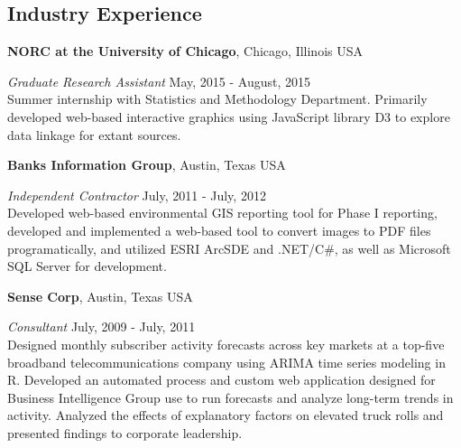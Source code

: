 \documentclass[margin,line]{res}
\begin{document}
\begin{resume}
% 
% 
% 

\section{\sc Industry Experience}
{\bf NORC at the University of Chicago}, Chicago, Illinois USA

\vspace{-.3cm}
{\em Graduate Research Assistant} \hfill {May, 2015 - August, 2015}\\
Summer internship with Statistics and Methodology Department. Primarily developed web-based interactive graphics using JavaScript library D3 to explore data linkage for extant sources. 

{\bf Banks Information Group}, Austin, Texas USA

\vspace{-.3cm}
{\em Independent Contractor} \hfill {July, 2011 - July, 2012}\\
Developed web-based environmental GIS reporting tool for Phase I reporting, developed and implemented a web-based tool to convert images to PDF files programatically, and utilized ESRI ArcSDE and .NET/C\#, as well as Microsoft SQL Server for development.

{\bf Sense Corp}, Austin, Texas USA

\vspace{-.3cm}
{\em Consultant} \hfill {July, 2009 - July, 2011}\\
Designed monthly subscriber activity forecasts across key markets at a top-five broadband telecommunications company using ARIMA time series modeling in R. Developed an automated process and custom web application designed for Business Intelligence Group use to run forecasts and analyze long-term trends in activity. Analyzed the effects of explanatory factors on elevated truck rolls and presented findings to corporate leadership.


\end{resume}
\end{document}
